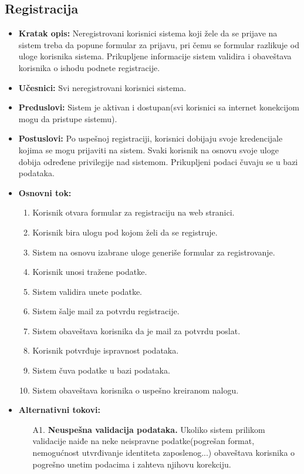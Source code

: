 \documentclass{article}
\begin{document}
\subsection{Registracija}
\begin{itemize}
    \item \textbf{Kratak opis:} Neregistrovani korisnici sistema koji žele da se prijave na sistem treba da popune formular za prijavu, pri čemu se formular razlikuje od uloge korisnika sistema. Prikupljene informacije sistem validira i obaveštava korisnika o ishodu podnete registracije.
    \item \textbf{Učesnici:} Svi neregistrovani korisnici sistema.
    \item \textbf{Preduslovi:} Sistem je aktivan i dostupan(svi korisnici sa internet konekcijom mogu da pristupe sistemu).
    \item \textbf{Postuslovi:} Po uspešnoj registraciji, korisnici dobijaju svoje kredencijale kojima se mogu prijaviti na sistem. Svaki korisnik na osnovu svoje uloge dobija određene privilegije nad sistemom. Prikupljeni podaci čuvaju se u bazi podataka.
    \item \textbf{Osnovni tok:}
        \begin{enumerate}
            \item Korisnik otvara formular za registraciju na web stranici.
            \item Korisnik bira ulogu pod kojom želi da se registruje.
            \item Sistem na osnovu izabrane uloge generiše formular za registrovanje.
            \item Korisnik unosi tražene podatke.
            \item Sistem validira unete podatke.
            \item Sistem šalje mail za potvrdu registracije.
            \item Sistem obaveštava korisnika da je mail za potvrdu poslat.
            \item Korisnik potvrđuje ispravnost podataka.
            \item Sistem čuva podatke u bazi podataka.
            \item Sistem obaveštava korisnika o uspešno kreiranom nalogu.
	    \end{enumerate}
    \item \textbf{Alternativni tokovi:}
        \begin{itemize}
            \item[A1.] \textbf{Neuspešna validacija podataka.} Ukoliko sistem prilikom validacije naiđe na neke neispravne podatke(pogrešan format, nemogućnost utvrđivanje identiteta zaposlenog...) obaveštava korisnika o pogrešno unetim podacima i zahteva njihovu korekciju.

\end{itemize}
\end{itemize}
\end{document}

